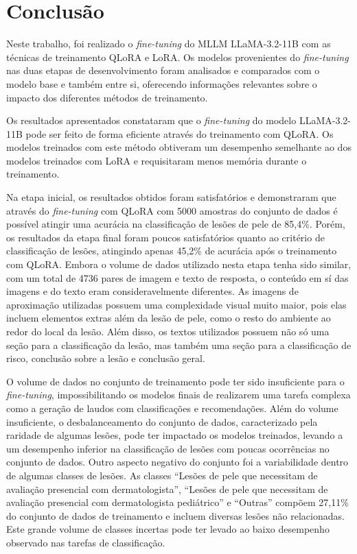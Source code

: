 \chapter{Conclusão}

Neste trabalho, foi realizado o \textit{fine-tuning} do \ac{MLLM} \ac{LLaMA}-3.2-11B com as técnicas de treinamento
\ac{QLoRA} e \ac{LoRA}. Os modelos provenientes do \textit{fine-tuning} nas duas etapas de desenvolvimento foram
analisados e comparados com o modelo base e também entre si, oferecendo informações relevantes sobre o impacto dos
diferentes métodos de treinamento.

Os resultados apresentados constataram que o \textit{fine-tuning} do modelo \ac{LLaMA}-3.2-11B pode ser feito de forma
eficiente através do treinamento com \ac{QLoRA}. Os modelos treinados com este método obtiveram um desempenho
semelhante ao dos modelos treinados com \ac{LoRA} e requisitaram menos memória durante o treinamento.

Na etapa inicial, os resultados obtidos foram satisfatórios e demonstraram que através do \textit{fine-tuning} com
\ac{QLoRA} com 5000 amostras do conjunto de dados é possível atingir uma acurácia na classificação
de lesões de pele de 85,4\%. Porém, os resultados da etapa final foram poucos satisfatórios quanto ao critério de
classificação de lesões, atingindo apenas 45,2\% de acurácia após o treinamento com \ac{QLoRA}. Embora o volume de
dados utilizado nesta etapa tenha sido similar, com um total de 4736 pares de imagem e texto de resposta, o conteúdo em
sí das imagens e do texto eram consideravelmente diferentes. As imagens de aproximação utilizadas possuem uma
complexidade visual muito maior, pois elas incluem elementos extras além da lesão de pele, como o resto do ambiente ao
redor do local da lesão. Além disso, os textos utilizados possuem não só uma seção para a classificação da lesão, mas
também uma seção para a classificação de risco, conclusão sobre a lesão e conclusão geral.

O volume de dados no conjunto de treinamento pode ter sido insuficiente para o \textit{fine-tuning}, impossibilitando
os modelos finais de realizarem uma tarefa complexa como a geração de laudos com classificações e recomendações. Além
do volume insuficiente, o desbalanceamento do conjunto de dados, caracterizado pela raridade de algumas lesões, pode
ter impactado os modelos treinados, levando a um desempenho inferior na classificação de lesões com poucas ocorrências
no conjunto de dados. Outro aspecto negativo do conjunto foi a variabilidade dentro de algumas classes de lesões. As
classes ``Lesões de pele que necessitam de avaliação presencial com dermatologista'', ``Lesões de pele que necessitam
de avaliação presencial com dermatologista pediátrico'' e ``Outras'' compõem 27,11\% do conjunto de dados de
treinamento e incluem diversas lesões não relacionadas. Este grande volume de classes incertas pode ter levado ao baixo
desempenho observado nas tarefas de classificação.

